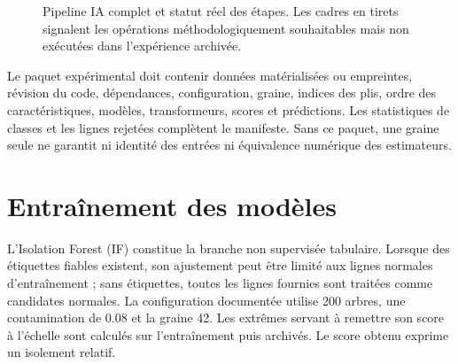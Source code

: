 \documentclass[11pt,a4paper,oneside]{report}
\theoremstyle{definition}
\theoremstyle{plain}
\begin{document}
\begin{figure}[tb]
{}
\caption{Pipeline IA complet et statut réel des étapes. Les cadres en tirets
signalent les opérations méthodologiquement souhaitables mais non exécutées
dans l'expérience archivée.}
\label{fig:data-offline-pipeline}
\end{figure}

Le paquet expérimental doit contenir données matérialisées ou empreintes,
révision du code, dépendances, configuration, graine, indices des plis, ordre
des caractéristiques, modèles, transformeurs, scores et prédictions. Les
statistiques de classes et les lignes rejetées complètent le manifeste. Sans ce
paquet, une graine seule ne garantit ni identité des entrées ni équivalence
numérique des estimateurs.

\section{Entraînement des modèles}

L'Isolation Forest (IF) constitue la branche non supervisée tabulaire. Lorsque
des étiquettes fiables existent, son ajustement peut être limité aux lignes
normales d'entraînement ; sans étiquettes, toutes les lignes fournies sont
traitées comme candidates normales. La configuration documentée utilise 200
arbres, une contamination de 0.08 et la graine 42. Les extrêmes servant à
remettre son score à l'échelle sont calculés sur l'entraînement puis archivés.
Le score obtenu exprime un isolement relatif.
\end{document}

